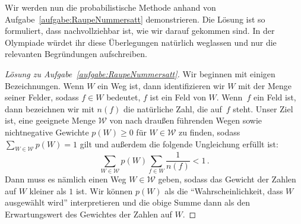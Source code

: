 Wir werden nun die probabilistische Methode anhand von Aufgabe~\ref{aufgabe:RaupeNummersatt} demonstrieren. Die Lösung ist so formuliert, dass nachvollziehbar ist, wie wir darauf gekommen sind. In der Olympiade würdet ihr diese Überlegungen natürlich weglassen und nur die relevanten Begründungen aufschreiben.

\begin{proof}[Lösung zu Aufgabe~\ref{aufgabe:RaupeNummersatt}]
	Wir beginnen mit einigen Bezeichnungen. Wenn $W$ ein Weg ist, dann identifizieren wir $W$ mit der Menge seiner Felder, sodass $f\in W$ bedeutet, $f$ ist ein Feld von $W$. Wenn~$f$ ein Feld ist, dann bezeichnen wir mit $n(f)$ die natürliche Zahl, die auf~$f$ steht. Unser Ziel ist, eine geeignete Menge $\mathcal W$ von nach draußen führenden Wegen sowie nichtnegative Gewichte $p(W)\geqslant 0$ für $W\in\mathcal W$ zu finden, sodass $\sum_{W\in \mathcal W}p(W)=1$ gilt und außerdem die folgende Ungleichung erfüllt ist:
	\begin{equation*}
		\sum_{W\in \mathcal{W}} p(W)\sum_{f\in W} \frac{1}{n(f)}<1\,.
	\end{equation*}
	Dann muss es nämlich einen Weg $W\in\mathcal W$ geben, sodass das Gewicht der Zahlen auf $W$ kleiner als $1$ ist. Wir können $p(W)$ als die \enquote{Wahrscheinlichkeit, dass $W$ ausgewählt wird} interpretieren und die obige Summe dann als den Erwartungswert des Gewichtes der Zahlen auf $W$.
	

\end{proof}
